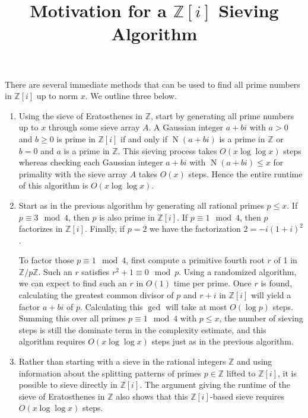 \documentclass{article}
\begin{document}
\title{Motivation for a $\mathbb{Z}[i]$ Sieving Algorithm}
\date{}
\maketitle


There are several immediate methods that can be used to find all prime numbers in $\mathbb{Z}[i]$ up to norm $x$. We outline three below.
\begin{enumerate}
\item Using the sieve of Eratosthenes in $\mathbb{Z}$, start by generating all prime numbers up to $x$ through some sieve array $A$. A Gaussian integer $a + bi$ with $a > 0$ and $b\ge 0$ is prime in $\mathbb{Z}[i]$ if and only if $\operatorname N(a + bi)$ is a prime in $\mathbb{Z}$ or $b = 0$ and $a$ is a prime in $\mathbb{Z}$. This sieving process takes $O(x \log \log x)$ steps whereas checking each Gaussian integer $a + bi$ with $\operatorname N(a + bi) \le x$ for primality with the sieve array $A$ takes $O(x)$ steps. Hence the entire runtime of this algorithm is $O(x \log \log x)$.

\item Start as in the previous algorithm by generating all rational primes $p\le x$. If $p \equiv 3 \mod 4$, then $p$ is also prime in $\mathbb{Z}[i]$. If $p \equiv 1 \mod 4$, then $p$ factorizes in $\mathbb{Z}[i]$. Finally, if $p = 2$ we have the factorization $2 = - i (1 + i) ^ 2$.

To factor those $p \equiv 1 \mod 4$, first compute a primitive fourth root $r$ of 1 in $\mathbb{Z}/p\mathbb{Z}$. Such an $r$ satisfies $r ^ 2 + 1 \equiv 0 \mod p$. Using a randomized algorithm, we can expect to find such an $r$ in $O(1)$ time per prime. Once $r$ is found, calculating the greatest common divisor of $p$ and $r + i$ in $\mathbb{Z}[i]$ will yield a factor $a + bi$ of $p$. Calculating this $\gcd$ will take at most $O(\log p)$ steps. Summing this over all primes $p\equiv 1 \mod 4$ with $p\le x$, the number of sieving steps is still the dominate term in the complexity estimate, and this algorithm requires $O(x \log \log x)$ steps just as in the previous algorithm.

\item Rather than starting with a sieve in the rational integers $\mathbb{Z}$ and using information about the splitting patterns of primes $p\in\mathbb{Z}$ lifted to $\mathbb{Z}[i]$, it is possible to sieve directly in $\mathbb{Z}[i]$. The argument giving the runtime of the sieve of Eratosthenes in $\mathbb{Z}$ also shows that this $\mathbb{Z}[i]$-based sieve requires $O(x \log \log x)$ steps.
\end{enumerate}
\end{document}
